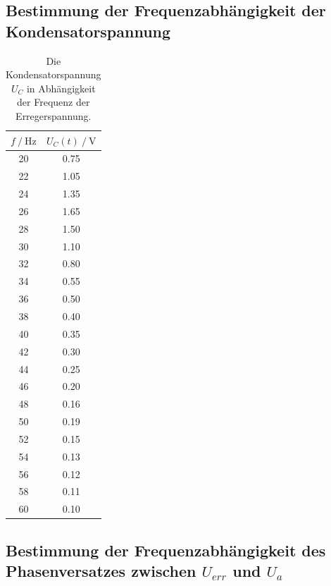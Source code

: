 \subsection{Bestimmung der Frequenzabhängigkeit der Kondensatorspannung}
\label{Kondensatorspannung}

\begin{table}[H]
  \centering
  \caption{Die Kondensatorspannung $U_C$ in Abhängigkeit der Frequenz der Erregerspannung.}
  \begin{tabular}{cc}
    \toprule
    {$f \mathbin{/} \unit{\hertz}$} &
    {$U_C(t) \mathbin{/} \unit{\volt}$} \\
    \midrule
    20 & 0.75 \\
    22 & 1.05 \\
    24 & 1.35 \\
    26 & 1.65 \\
    28 & 1.50 \\
    30 & 1.10 \\
    32 & 0.80 \\
    34 & 0.55 \\
    36 & 0.50 \\
    38 & 0.40 \\
    40 & 0.35 \\
    42 & 0.30 \\
    44 & 0.25 \\
    46 & 0.20 \\
    48 & 0.16 \\
    50 & 0.19 \\
    52 & 0.15 \\
    54 & 0.13 \\
    56 & 0.12 \\
    58 & 0.11 \\
    60 & 0.10 \\

    \bottomrule
  \end{tabular}
  \label{tab:Tabelle1}
\end{table}









\subsection{Bestimmung der Frequenzabhängigkeit des Phasenversatzes zwischen $U_{err}$ und $U_{a}$}
\label{Phasenversatz}


